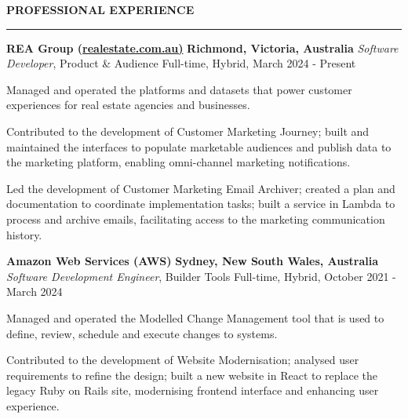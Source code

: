 \documentclass{cv}
\begin{document}
\textbf{\uppercase{Professional Experience}}
\sectionlineskip
\hrule height 0.6pt
\begin{list}{}{\setlength{\leftmargin}{0pt}}
\item
    \textbf{REA Group (\href{https://realestate.com.au/}{realestate.com.au)}} \hfill \textbf{Richmond, Victoria, Australia}%
    \vspace{1.0pt} \newline 
    {\textit{Software Developer}, Product \& Audience} \hfill {Full-time, Hybrid, March 2024 - Present}%
    \begin{list}{\raisebox{2.0pt}{\tiny$\bullet$}\space}{\setlength{\leftmargin}{11.2pt}}
        \itemsep -5.0pt \vspace{-4.0pt}
        \item Managed and operated the platforms and datasets that power customer experiences for real estate agencies and businesses.
        \item Contributed to the development of Customer Marketing Journey; built and maintained the interfaces to populate marketable audiences and publish data to the marketing platform, enabling omni-channel marketing notifications.
        \item Led the development of Customer Marketing Email Archiver; created a plan and documentation to coordinate implementation tasks; built a service in Lambda to process and archive emails, facilitating access to the marketing communication history.
    \end{list}
\item 
    \textbf{Amazon Web Services (AWS)} \hfill \textbf{Sydney, New South Wales, Australia}%
    \vspace{1.0pt} \newline 
    {\textit{Software Development Engineer}, Builder Tools} \hfill {Full-time, Hybrid, October 2021 - March 2024}%
    \begin{list}{\raisebox{2.0pt}{\tiny$\bullet$}\space}{\setlength{\leftmargin}{11.2pt}}
        \itemsep -5.0pt \vspace{-4.0pt}
        \item Managed and operated the Modelled Change Management tool that is used to define, review, schedule and execute changes to systems.
        \item Contributed to the development of Website Modernisation; analysed user requirements to refine the design; built a new website in React to replace the legacy Ruby on Rails site, modernising frontend interface and enhancing user experience.

\end{list}
\end{list}
\end{document}
